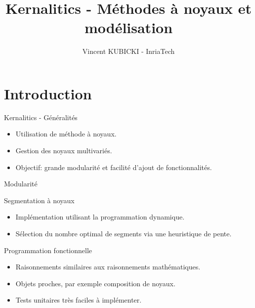 \documentclass{beamer}
\title[Kernalitics]{Kernalitics - Méthodes à noyaux et modélisation}
\author[VK]{Vincent KUBICKI - InriaTech}
\institute[Inria]{Inria Lille - Nord Europe}
\begin{document}
\begin{frame}[plain]
	\titlepage
\end{frame}

\section{Introduction}

\begin{frame}{Kernalitics - Généralités}
	\begin{itemize}
		\item Utilisation de méthode à noyaux.
		\item Gestion des noyaux multivariés.
		\item Objectif: grande modularité et facilité d'ajout de fonctionnalités.
	\end{itemize}
\end{frame}

\begin{frame}{Modularité}
\end{frame}

\begin{frame}{Segmentation à noyaux}
	\begin{itemize}
		\item Implémentation utilisant la programmation dynamique.
		\item Sélection du nombre optimal de segments via une heuristique de pente.
	\end{itemize}
\end{frame}
\begin{frame}{Programmation fonctionnelle}
	\begin{itemize}
		\item Raisonnements similaires aux raisonnements mathématiques.
		\item Objets proches, par exemple composition de noyaux.
		\item Tests unitaires très faciles à implémenter.
	\end{itemize}
\end{frame}
\end{document}

